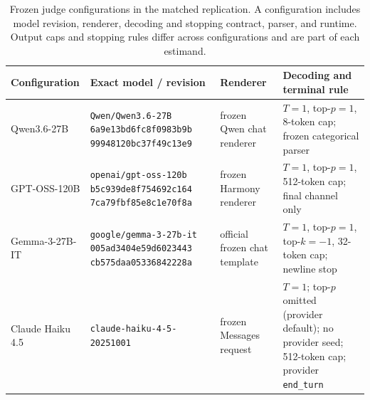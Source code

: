 \begin{table}[t]
\centering
\footnotesize
\setlength{\tabcolsep}{3.8pt}
\begin{tabular}{p{}p{}p{}p{}}
\toprule
Configuration & Exact model / revision & Renderer & Decoding and terminal rule \\
\midrule
Qwen3.6-27B &
\texttt{Qwen/Qwen3.6-27B}\newline
\texttt{6a9e13bd6fc8f0983b9b}\newline
\texttt{99948120bc37f49c13e9} &
frozen Qwen chat renderer &
$T=1$, top-$p=1$, 8-token cap; frozen categorical parser \\
GPT-OSS-120B &
\texttt{openai/gpt-oss-120b}\newline
\texttt{b5c939de8f754692c164}\newline
\texttt{7ca79fbf85e8c1e70f8a} &
frozen Harmony renderer &
$T=1$, top-$p=1$, 512-token cap; final channel only \\
Gemma-3-27B-IT &
\texttt{google/gemma-3-27b-it}\newline
\texttt{005ad3404e59d6023443}\newline
\texttt{cb575daa05336842228a} &
official frozen chat template &
$T=1$, top-$p=1$, top-$k=-1$, 32-token cap; newline stop \\
Claude Haiku 4.5 &
\texttt{claude-haiku-4-5-}\newline
\texttt{20251001} &
frozen Messages request &
$T=1$; top-$p$ omitted (provider default); no provider seed; 512-token cap;
provider \texttt{end\_turn} \\
\bottomrule
\end{tabular}
\caption{Frozen judge configurations in the matched replication. A
configuration includes model revision, renderer, decoding and stopping
contract, parser, and runtime. Output caps and stopping rules differ across
configurations and are part of each estimand.}
\label{tab:judge-configurations}
\end{table}
